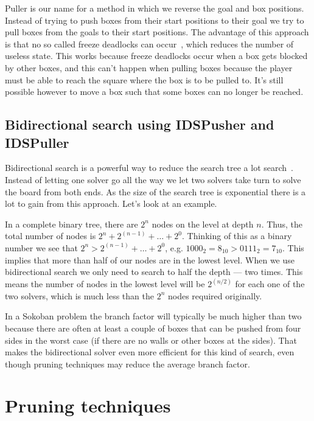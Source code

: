 \documentclass[a4paper,11pt]{article}
\renewcommand{\*}[0]{\cdot}
\begin{document}
Puller is our name for a method in which we reverse the goal and box positions.
Instead of trying to push boxes from their start positions to their goal we try
to pull boxes from the goals to their start positions. The advantage of this
approach is that no so called freeze deadlocks can occur~\cite{takes2007},
which reduces the number of useless state. This works because freeze deadlocks
occur when a box gets blocked by other boxes, and this can't happen when
pulling boxes because the player must be able to reach the square where the box
is to be pulled to.  It's still possible however to move a box such that some
boxes can no longer be reached.


\subsection{Bidirectional search using IDSPusher and IDSPuller}

Bidirectional search is a powerful way to reduce the search tree a lot
search~\cite{russell2009}. Instead of letting one solver go all the way we let
two solvers take turn to solve the board from both ends. As the size of the
search tree is exponential there is a lot to gain from this approach. Let's
look at an example.

In a complete binary tree, there are $2^n$ nodes on the level at depth $n$.
Thus, the total number of nodes is $2^n + 2^{(n-1)} + \ldots + 2^0$. Thinking
of this as a binary number we see that $2^n > 2^{(n-1)} + \ldots + 2^0$, e.g.
$1000_2 = 8_{10} > 0111_2 = 7_{10}$. This implies that more than half of our
nodes are in the lowest level. When we use bidirectional search we only need to
search to half the depth --- two times. This means the number of nodes in the
lowest level will be $2^{(n/2)}$ for each one of the two solvers, which is much
less than the $2^n$ nodes required originally.

In a Sokoban problem the branch factor will typically be much higher than two
because there are often at least a couple of boxes that can be pushed from four
sides in the worst case (if there are no walls or other boxes at the sides).
That makes the bidirectional solver even more efficient for this kind of
search, even though pruning techniques may reduce the average branch factor.



\section{Pruning techniques}
\end{document}
